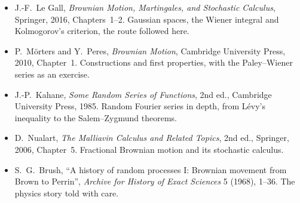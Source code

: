 \begin{itemize}
interessante Kurven im Hilbertschen Raum'', \emph{Doklady Akad.\ Nauk SSSR} 26 (1940), 115--118.
\item J.-F.~Le Gall, \emph{Brownian Motion, Martingales, and Stochastic Calculus}, Springer, 2016, Chapters~1--2. Gaussian spaces, the Wiener integral and Kolmogorov's criterion, the route followed here.
\item P.~M\"orters and Y.~Peres, \emph{Brownian Motion}, Cambridge University Press, 2010, Chapter~1. Constructions and first properties, with the Paley--Wiener series as an exercise.
\item J.-P.~Kahane, \emph{Some Random Series of Functions}, 2nd ed., Cambridge University Press, 1985. Random Fourier series in depth, from L\'evy's inequality to the Salem--Zygmund theorems.
\item D.~Nualart, \emph{The Malliavin Calculus and Related Topics}, 2nd ed., Springer, 2006, Chapter~5. Fractional Brownian motion and its stochastic calculus.
\item S.~G.~Brush, ``A history of random processes I: Brownian movement from Brown to Perrin'', \emph{Archive for History of Exact Sciences} 5 (1968), 1--36. The physics story told with care.
\end{itemize}
